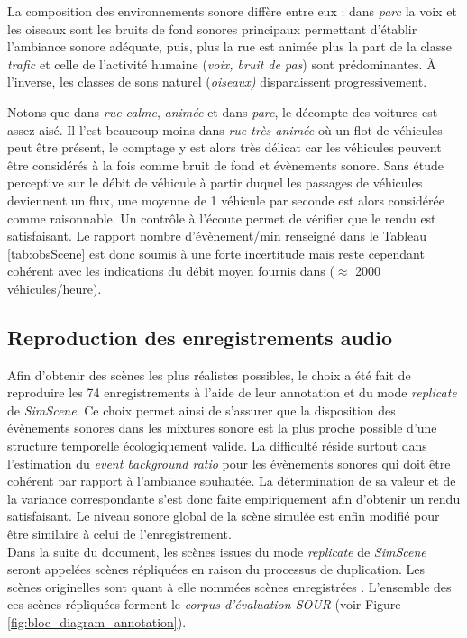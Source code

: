 La composition des environnements sonore diffère entre eux : dans \textit{parc} la voix et les oiseaux sont les bruits de fond sonores principaux permettant d'établir l'ambiance sonore adéquate, puis, plus la rue est animée plus la part de la classe \textit{trafic} et celle de l'activité humaine (\textit{voix, bruit de pas}) sont prédominantes. À l'inverse, les classes de sons \og naturel \fg{} (\textit{oiseaux)} disparaissent progressivement.

Notons que dans \textit{rue calme}, \textit{animée} et dans \textit{parc}, le décompte des voitures est assez aisé. Il l'est beaucoup moins dans \textit{rue très animée} où un flot de véhicules peut être présent, le comptage y est alors très délicat car les véhicules peuvent être considérés à la fois comme bruit de fond et évènements sonore.
Sans étude perceptive sur le débit de véhicule à partir duquel les passages de véhicules deviennent un flux, une moyenne de 1 véhicule par seconde est alors considérée comme raisonnable. Un contrôle à l'écoute permet de vérifier que le rendu est satisfaisant. Le rapport nombre d'évènement/min renseigné dans le Tableau \ref{tab:obsScene} est donc soumis à une forte incertitude mais reste cependant cohérent avec les indications du débit moyen fournis dans \cite{aumond2017modeling} ($\approx$ 2000 véhicules/heure). \\

\subsection{Reproduction des enregistrements audio}

Afin d'obtenir des scènes les plus réalistes possibles, le choix a été fait de reproduire les 74 enregistrements à l'aide de leur annotation et du mode \textit{replicate} de \textit{SimScene}. Ce choix permet ainsi de s'assurer que la disposition des évènements sonores dans les mixtures sonore est la plus proche possible d'une structure temporelle écologiquement valide. La difficulté réside surtout dans l'estimation du \textit{event background ratio} pour les évènements sonores qui doit être cohérent par rapport à l'ambiance souhaitée. La détermination de sa valeur et de la variance correspondante s'est donc faite empiriquement afin d'obtenir un rendu satisfaisant. Le niveau sonore global de la scène simulée est enfin modifié pour être similaire à celui de l'enregistrement.\\

Dans la suite du document, les scènes issues du mode \textit{replicate} de \textit{SimScene} seront appelées \og scènes répliquées \fg{} en raison du processus de duplication. Les scènes originelles sont quant à elle nommées \og scènes enregistrées \fg{}. L'ensemble des ces scènes répliquées forment le \textit{corpus d'évaluation SOUR} (voir Figure \ref{fig:bloc_diagram_annotation}).\\


